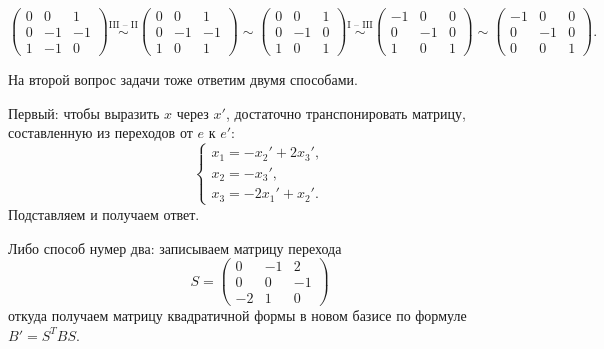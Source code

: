\begin{equation*}
    \begin{pmatrix}
        0 & 0 & 1 \\ 0 & -1 & -1 \\ 1 & -1 & 0
    \end{pmatrix} \overset{\text{III -- II}}{\sim} \begin{pmatrix}
        0 & 0 & 1 \\ 0 & -1 & -1 \\ 1 & 0 & 1
    \end{pmatrix} \sim \begin{pmatrix}
        0 & 0 & 1 \\ 0 & -1 & 0 \\ 1 & 0 & 1
    \end{pmatrix} \overset{\text{I -- III}}{\sim} \begin{pmatrix}
        -1 & 0 & 0 \\ 0 & -1 & 0 \\ 1 & 0 & 1
    \end{pmatrix} \sim \begin{pmatrix}
        -1 & 0 & 0 \\ 0 & -1 & 0 \\ 0 & 0 & 1
    \end{pmatrix}.
\end{equation*}

На второй вопрос задачи тоже ответим двумя способами. 

Первый: чтобы выразить $x$ через $x'$, достаточно транспонировать матрицу, составленную из переходов от $e$ к $e'$:
\begin{equation*}
    \begin{cases}
        x_1 = -x_2' + 2x_3', \\ x_2 = -x_3', \\ x_3 = -2x_1' + x_2'.
    \end{cases}
\end{equation*}
Подставляем и получаем ответ.

Либо способ нумер два: записываем матрицу перехода
\begin{equation*}
    S = \begin{pmatrix}
        0 & -1 & 2 \\ 0 & 0 & -1 \\ -2 & 1 & 0
    \end{pmatrix}
\end{equation*}
откуда получаем матрицу квадратичной формы в новом базисе по формуле $B' = S^TBS$.

